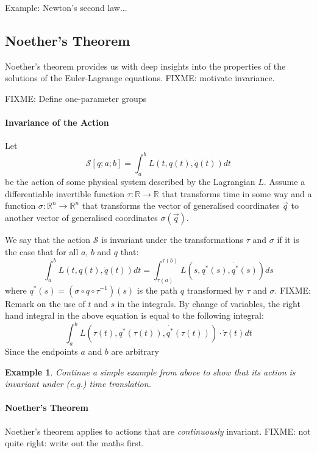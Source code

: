 \documentclass[preprint]{sigplanconf}
\theoremstyle{examplestyle}
\newtheorem{example}{Example}
\begin{document}
Example: Newton's second law...

\subsection{Noether's Theorem} Noether's theorem provides us with deep
insights into the properties of the solutions of the Euler-Lagrange
equations. FIXME: motivate invariance.

FIXME: Define one-parameter groups

\paragraph{Invariance of the Action} Let
\begin{displaymath}
  \mathcal{S}[q;a;b] = \int_a^b L(t,q(t),\dot{q}(t)) \mathit{dt}
\end{displaymath}
be the action of some physical system described by the Lagrangian
$L$. Assume a differentiable invertible function $\tau : \mathbb{R}
\to \mathbb{R}$ that transforms time in some way and a function
$\sigma : \mathbb{R}^n \to \mathbb{R}^n$ that transforms the vector of
generalised coordinates $\vec{q}$ to another vector of generalised
coordinates $\sigma(\vec{q})$.

We say that the action $\mathcal{S}$ is invariant under the
transformations $\tau$ and $\sigma$ if it is the case that for all
$a$, $b$ and $q$ that:
\begin{equation}\label{eq:invariance}
    \int_a^b L(t,q(t),\dot{q}(t)) \mathit{dt}
    = \int_{\tau(a)}^{\tau(b)} L(s, q^*(s), \dot{q^*}(s)) \mathit{ds}
\end{equation}
where $q^*(s) = (\sigma \circ q \circ \tau^{-1})(s)$ is the path $q$
transformed by $\tau$ and $\sigma$.  FIXME: Remark on the use of $t$
and $s$ in the integrals. By change of variables, the right hand
integral in the above equation is equal to the following integral:
\begin{displaymath}
  \int_a^b L(\tau(t), q^*(\tau(t)), \dot{q^*}(\tau(t)))\cdot \dot{\tau}(t) \mathit{dt}
\end{displaymath}
Since the endpoints $a$ and $b$ are arbitrary 


\begin{example}
  Continue a simple example from above to show that its action is
  invariant under (e.g.) time translation.
\end{example}

\paragraph{Noether's Theorem} Noether's theorem applies to actions
that are \emph{continuously} invariant. FIXME: not quite right: write
out the maths first.
\end{document}
